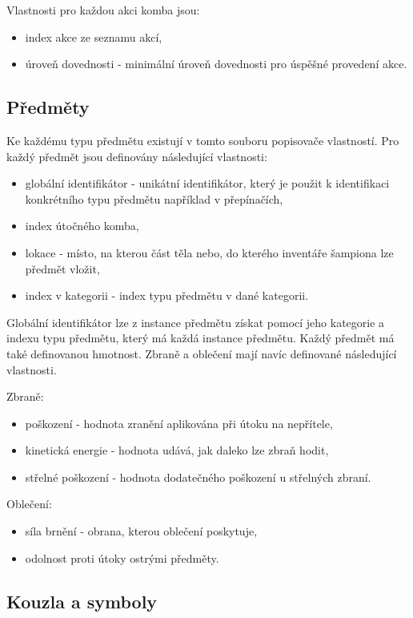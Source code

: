 Vlastnosti pro každou akci komba jsou:
\begin{itemize}
\item index akce ze seznamu akcí, 
\item úroveň dovednosti - minimální úroveň dovednosti pro úspěšné provedení akce. 
\end{itemize}


\subsection{Předměty}

Ke každému typu předmětu existují v tomto souboru popisovače vlastností\cite{DMItemDescriptors}.
Pro každý předmět jsou definovány následující vlastnosti:  
\begin{itemize}
\item globální identifikátor - unikátní identifikátor, který je použit k identifikaci konkrétního typu předmětu například v přepínačích,
\item index útočného komba,
\item lokace - místo, na kterou část těla nebo, do kterého inventáře šampiona lze předmět vložit,
\item index v kategorii - index typu předmětu v dané kategorii.
\end{itemize}

Globální identifikátor lze z instance předmětu získat pomocí jeho kategorie a indexu typu předmětu,
který má každá instance předmětu. Každý předmět má také definovanou hmotnost. Zbraně a oblečení mají navíc
definované následující vlastnosti\cite{DMItems}.

Zbraně:
\begin{itemize}
\item poškození - hodnota zranění aplikována při útoku na nepřítele,
\item kinetická energie - hodnota udává, jak daleko lze zbraň hodit,
\item střelné poškození - hodnota dodatečného poškození u střelných zbraní.
\end{itemize}

Oblečení:
\begin{itemize}
\item síla brnění - obrana, kterou oblečení poskytuje, 
\item odolnost proti útoky ostrými předměty. 
\end{itemize}

\subsection{Kouzla a symboly}

